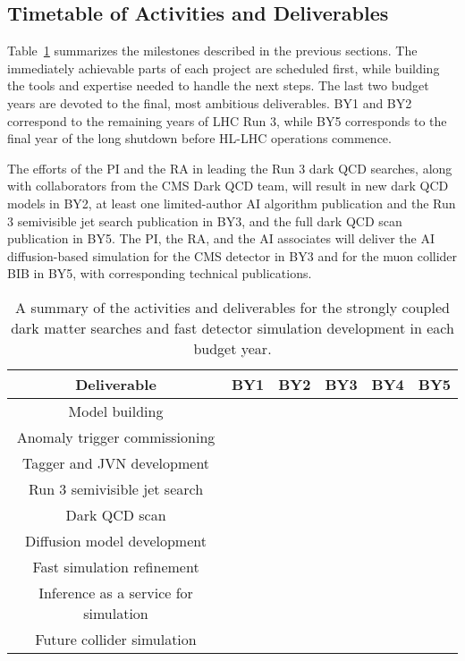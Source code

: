 \subsection{Timetable of Activities and Deliverables}

Table~\ref{tab:activities} summarizes the milestones described in the previous sections.
The immediately achievable parts of each project are scheduled first,
while building the tools and expertise needed to handle the next steps.
The last two budget years are devoted to the final, most ambitious deliverables.
BY1 and BY2 correspond to the remaining years of LHC Run 3, while BY5 corresponds to the final year of the long shutdown before HL-LHC operations commence.

The efforts of the PI and the RA in leading the Run 3 dark QCD searches, along with collaborators from the CMS Dark QCD team,
will result in new dark QCD models in BY2, at least one limited-author AI algorithm publication and the Run 3 semivisible jet search publication in BY3, and the full dark QCD scan publication in BY5.
The PI, the RA, and the AI associates will deliver the AI diffusion-based simulation for the CMS detector in BY3
and for the muon collider BIB in BY5, with corresponding technical publications.

\begin{table}[!hbtp]
\vspace{\myfigurespacing}
\begin{center}
\begin{tabular}{|c|c|c|c|c|c|}
\hline
Deliverable & BY1 & BY2 & BY3 & BY4 & BY5 \\
\hline
Model building & \cellcolor{blue!25} & \cellcolor{blue!25} & & & \\
\hline
Anomaly trigger commissioning & \cellcolor{blue!25} & \cellcolor{blue!25} & & & \\
\hline
Tagger and JVN development & \cellcolor{blue!25} & \cellcolor{blue!25} & \cellcolor{blue!25} & & \\
\hline
Run 3 semivisible jet search & & \cellcolor{blue!50} & \cellcolor{blue!50} & & \\
\hline
Dark QCD scan & & & \cellcolor{blue!75} & \cellcolor{blue!75} & \cellcolor{blue!75} \\
\hline
\hline
Diffusion model development & \cellcolor{orange!25} & \cellcolor{orange!25} & \cellcolor{orange!25} & & \\
\hline
Fast simulation refinement & \cellcolor{orange!25} & \cellcolor{orange!25} & \cellcolor{orange!25} & & \\
\hline
Inference as a service for simulation & & \cellcolor{orange!50} & \cellcolor{orange!50} & \cellcolor{orange!50} & \\
\hline
Future collider simulation & & & & \cellcolor{orange!75} & \cellcolor{orange!75} \\
\hline
\end{tabular}
\vspace{\myfigureskip}
\caption{A summary of the activities and deliverables for the strongly coupled dark matter searches and fast detector simulation development in each budget year.}
\label{tab:activities}
\end{center}
\end{table}

\clearpage
